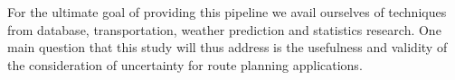 For the ultimate goal of providing this pipeline we avail ourselves of
techniques from database, transportation, weather prediction and statistics
research. One main question that this study will thus address is the
usefulness and validity of the consideration of uncertainty for route 
planning applications.
% 




